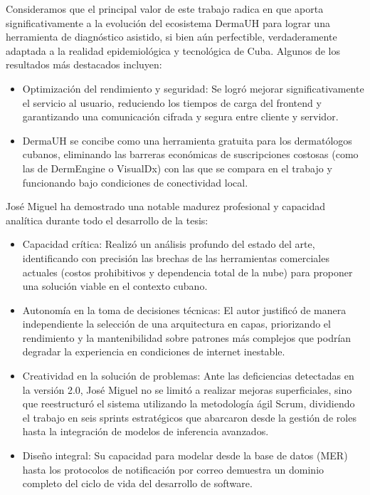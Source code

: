 \begin{opinion}
    Consideramos que el principal valor de este trabajo radica en que aporta 
    significativamente a la evolución del ecosistema DermaUH para lograr una herramienta de 
    diagnóstico asistido, si bien aún perfectible, verdaderamente adaptada a la realidad 
    epidemiológica y tecnológica de Cuba. Algunos de los resultados más destacados incluyen:
    
    \begin{itemize}
        \item Optimización del rendimiento y seguridad: Se logró mejorar significativamente el servicio al usuario, reduciendo los tiempos de carga del frontend y garantizando una comunicación cifrada y segura entre cliente y servidor.
        \item DermaUH se concibe como una herramienta gratuita para los dermatólogos cubanos, eliminando las barreras económicas de suscripciones costosas (como las de DermEngine o VisualDx) con las que se compara en el trabajo y funcionando bajo condiciones de conectividad local.
    \end{itemize}

    José Miguel ha demostrado una notable madurez profesional y capacidad analítica durante todo el desarrollo de la tesis:
    \begin{itemize}
        \item Capacidad crítica: Realizó un análisis profundo del estado del arte, identificando con precisión las brechas de las herramientas comerciales actuales (costos prohibitivos y dependencia total de la nube) para proponer una solución viable en el contexto cubano.
        \item Autonomía en la toma de decisiones técnicas: El autor justificó de manera independiente la selección de una arquitectura en capas, priorizando el rendimiento y la mantenibilidad sobre patrones más complejos que podrían degradar la experiencia en condiciones de internet inestable.
        \item Creatividad en la solución de problemas: Ante las deficiencias detectadas en la versión 2.0, José Miguel no se limitó a realizar mejoras superficiales, sino que reestructuró el sistema utilizando la metodología ágil Scrum, dividiendo el trabajo en seis sprints estratégicos que abarcaron desde la gestión de roles hasta la integración de modelos de inferencia avanzados.
        \item Diseño integral: Su capacidad para modelar desde la base de datos (MER) hasta los protocolos de notificación por correo demuestra un dominio completo del ciclo de vida del desarrollo de software.
    \end{itemize}


\end{opinion}
